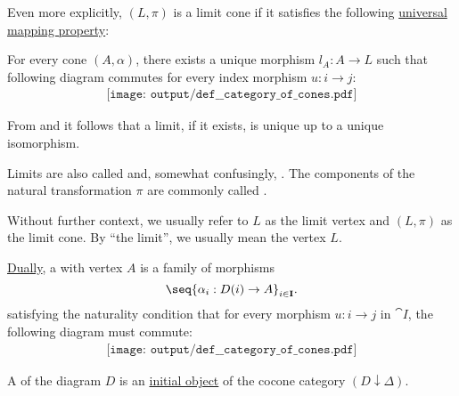 \begin{definition}
\begin{thmenum}
    Even more explicitly, \( (L, \pi) \) is a limit cone if it satisfies the following \hyperref[rem:universal_mapping_property]{universal mapping property}:
    \begin{displayquote}
      For every cone \( (A, \alpha) \), there exists a unique morphism \( l_A: A \to L \) such that following diagram commutes for every index morphism \( u: i \to j \):
      \begin{equation}\label{eq:def:category_of_cones/limit}
        \begin{aligned}
          \texttt{[image: output/def\_\_category\_of\_cones.pdf]}
        \end{aligned}
      \end{equation}
    \end{displayquote}

    From  and  it follows that a limit, if it exists, is unique up to a unique isomorphism.

    Limits are also called  and, somewhat confusingly, . The components of the natural transformation \( \pi \) are commonly called .

    Without further context, we usually refer to \( L \) as the limit vertex and \( (L, \pi) \) as the limit cone. By \enquote{the limit}, we usually mean the vertex \( L \).

     \hyperref[thm:categorical_principle_of_duality]{Dually}, a  with vertex \( A \) is a family of morphisms
    \begin{equation}\label{eq:def:category_of_cones/cocone}
      \seq{ \alpha_i: D(i) \to A }_{i \in \cat{I}}.
    \end{equation}
    satisfying the naturality condition that for every morphism \( u: i \to j \) in \( \cat{I} \), the following diagram must commute:
    \begin{equation}\label{eq:def:category_of_cones/cocone_nat}
      \begin{aligned}
        \texttt{[image: output/def\_\_category\_of\_cones.pdf]}
      \end{aligned}
    \end{equation}

     A  of the diagram \( D \) is an \hyperref[def:universal_objects/initial]{initial object} of the cocone category \( (D \downarrow \Delta) \).


\end{thmenum}
\end{definition}
